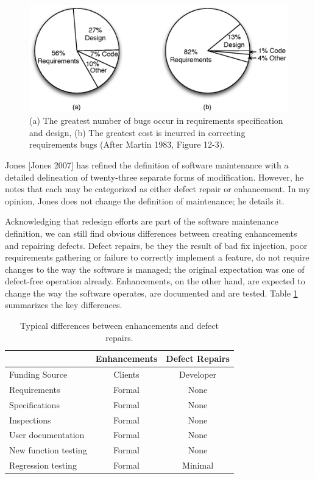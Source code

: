 \begin{figure}[htbp]
\begin{center}
\includegraphics[width=1.00\textwidth]{theory/images/Figure2-2}
\caption{(a) The greatest number of bugs occur in requirements specification and design, (b) The greatest cost is incurred in correcting requirements bugs (After Martin 1983, Figure 12-3).}
\label{fig:2.2}
\end{center}
\end{figure}

Jones [Jones 2007] has refined the definition of software maintenance with a detailed delineation of twenty-three separate forms of modification.  However, he notes that each may be categorized as either defect repair or enhancement.  In my opinion, Jones does not change the definition of maintenance; he details it.

Acknowledging that redesign efforts are part of the software maintenance definition, we can still find obvious differences between creating enhancements and repairing defects.  Defect repairs, be they the result of bad fix injection, poor requirements gathering or failure to correctly implement a feature, do not require changes to the way the software is managed; the original expectation was one of defect-free operation already.  Enhancements, on the other hand, are expected to change the way the software operates, are documented and are tested.  Table \ref{table:2.2} summarizes the key differences.

\begin{table}
    \centering
    \begin{tabular}{| l | c | c |}
    \hline
    & \textbf{Enhancements} & \textbf{Defect Repairs} \\ \hline
    Funding Source & Clients & Developer \\ \hline
    Requirements & Formal & None  \\ \hline
    Specifications & Formal & None  \\ \hline
    Inspections & Formal & None  \\ \hline
    User documentation & Formal & None  \\ \hline
    New function testing & Formal & None  \\ \hline
    Regression testing & Formal & Minimal  \\
    \hline
    \end{tabular}
    \caption[Table caption text]{Typical differences between enhancements and defect repairs.}
    \label{table:2.2}
\end{table}

